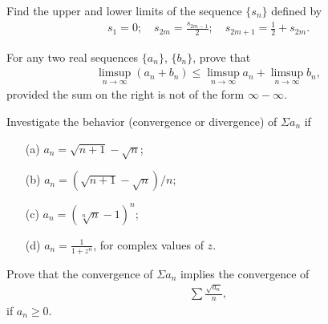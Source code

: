   \begin{exercise}[Rudin 3.4]
    Find the upper and lower limits of the sequence $\{s_n\}$ defined by
    \begin{align*}
      s_1 = 0; \quad s_{2m} = \frac{s_{2m-1}}{2}; \quad s_{2m+1} = \frac{1}{2} + s_{2m}.
    \end{align*}
  \end{exercise}
  \begin{solution}
    
  \end{solution}

  \begin{exercise}[Rudin 3.5]
    For any two real sequences $\{a_n\}$, $\{b_n\}$, prove that
    \begin{align*}
      \limsup_{n \to \infty} (a_n + b_n) \leq \limsup_{n \to \infty} a_n + \limsup_{n \to \infty} b_n,
    \end{align*}
    provided the sum on the right is not of the form $\infty - \infty$.
  \end{exercise}
  \begin{solution}
    
  \end{solution}

  \begin{exercise}[Rudin 3.6]
    Investigate the behavior (convergence or divergence) of $\Sigma a_n$ if
    \begin{enumerate} 
      \item[(a)] $a_n = \sqrt{n+1} - \sqrt{n}$;
      \item[(b)] $a_n = (\sqrt{n+1} - \sqrt{n})/n$;
      \item[(c)] $a_n = (\sqrt[n]{n} - 1)^n$;
      \item[(d)] $a_n = \frac{1}{1+z^n}$, for complex values of $z$.
    \end{enumerate}
  \end{exercise}
  \begin{solution}
    
  \end{solution}

  \begin{exercise}[Rudin 3.7]
    Prove that the convergence of $\Sigma a_n$ implies the convergence of
    \begin{align*}
      \sum \frac{\sqrt{a_n}}{n},
    \end{align*}
    if $a_n \geq 0$.
  \end{exercise}
  \begin{solution}
    
  \end{solution}

